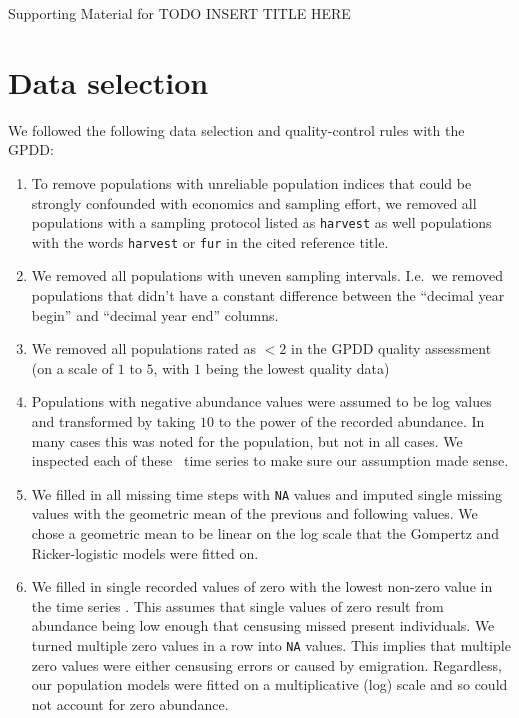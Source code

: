 
\begin{centering}
\LARGE
Supporting Material for TODO INSERT TITLE HERE\\[1.5em]
\end{centering}

\section{Data selection}

We followed the following data selection and quality-control rules with the GPDD:

\begin{enumerate}
\item
  To remove populations with unreliable population indices that could be strongly confounded with economics and sampling effort, we removed all populations with a sampling protocol listed as \texttt{harvest} as well populations with the words \texttt{harvest} or \texttt{fur} in the cited reference title.
\item
  We removed all populations with uneven sampling intervals. I.e.~we removed populations that didn't have a constant difference between the ``decimal year begin'' and ``decimal year end'' columns.
\item
  We removed all populations rated as $< 2$ in the GPDD quality assessment (on a scale of $1$ to $5$, with $1$ being the lowest quality data) \citep[following][]{sibly2005, ziebarth2010}
\item
  Populations with negative abundance values were assumed to be log values and transformed by taking $10$ to the power of the recorded abundance. In many cases this was noted for the population, but not in all cases. We inspected each of these \totalAssumedLog~time series to make sure our assumption made sense.
\item
  We filled in all missing time steps with \texttt{NA} values and imputed single missing values with the geometric mean of the previous and following values. We chose a geometric mean to be linear on the log scale that the Gompertz and Ricker-logistic models were fitted on.
\item
  We filled in single recorded values of zero with the lowest non-zero value in the time series \citep[following][]{brook2006a}. This assumes that single values of zero result from abundance being low enough that censusing missed present individuals. We turned multiple zero values in a row into \texttt{NA} values. This implies that multiple zero values were either censusing errors or caused by emigration. Regardless, our population models were fitted on a multiplicative (log) scale and so could not account for zero abundance.

\end{enumerate}
